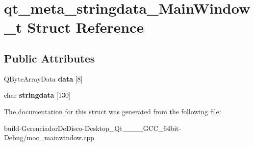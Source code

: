 \hypertarget{structqt__meta__stringdata__MainWindow__t}{}\section{qt\+\_\+meta\+\_\+stringdata\+\_\+\+Main\+Window\+\_\+t Struct Reference}
\label{structqt__meta__stringdata__MainWindow__t}
\subsection*{Public Attributes}
\begin{DoxyCompactItemize}
\item 
\hypertarget{structqt__meta__stringdata__MainWindow__t_ae8888f3a82b4bd7597ba5dad592aeec6}{}Q\+Byte\+Array\+Data {\bfseries data} \mbox{[}8\mbox{]}\label{structqt__meta__stringdata__MainWindow__t_ae8888f3a82b4bd7597ba5dad592aeec6}

\item 
\hypertarget{structqt__meta__stringdata__MainWindow__t_a36f09c6ee58fefb768d55e0f8051d219}{}char {\bfseries stringdata} \mbox{[}130\mbox{]}\label{structqt__meta__stringdata__MainWindow__t_a36f09c6ee58fefb768d55e0f8051d219}

\end{DoxyCompactItemize}


The documentation for this struct was generated from the following file\+:\begin{DoxyCompactItemize}
\item 
build-\/\+Gerenciador\+De\+Disco-\/\+Desktop\+\_\+\+Qt\+\_\+\_\+\_\+\_\+\+G\+C\+C\+\_\+64bit-\/\+Debug/moc\+\_\+mainwindow.\+cpp\end{DoxyCompactItemize}
